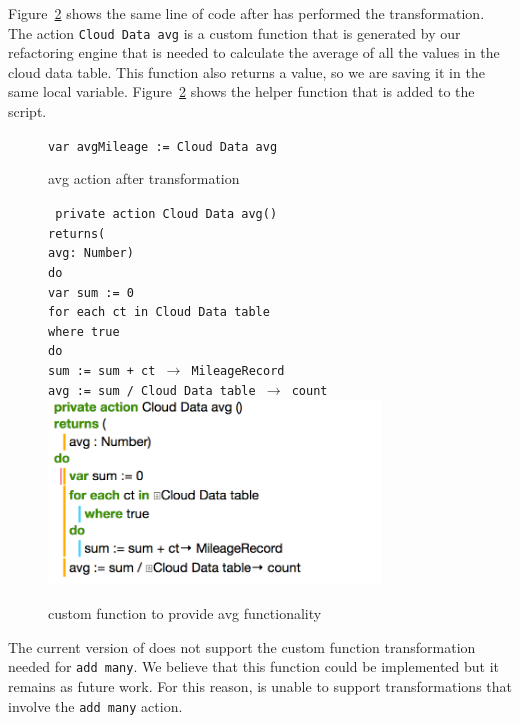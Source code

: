 \documentclass{sigplanconf}
\begin{document}
Figure~\ref{fig:CloudTable_avg_fun} shows the same line of code after \tool has performed the transformation.  The action \texttt{Cloud Data avg} is a custom function that is generated by our refactoring engine that is needed to calculate the average of all the values in the cloud data table.  This function also returns a value, so we are saving it in the same local variable.  Figure~\ref{fig:CloudTable_avg_fun} shows the helper function that is added to the script.

\begin{figure}[htbp!]
\begin{center}
\texttt{var avgMileage := Cloud Data avg}
\nocaptionrule
\caption{avg action after transformation}
\label{fig:CloudTable_avg}
\end{center}

\end{figure}
\begin{figure}[htbp!]
\texttt{ private action Cloud Data avg()\\ 
returns(\\
avg: Number)\\
do\\
var sum := 0\\
for each ct in Cloud Data table\\
where true\\
do\\
sum := sum + ct $\rightarrow$ MileageRecord\\
avg := sum / Cloud Data table $\rightarrow$ count}
\includegraphics[width=250pt]{images/HelperFunction}
\nocaptionrule
\caption{custom function to provide avg functionality}
\label{fig:CloudTable_avg_fun}
\end{figure}

The current version of \tool does not support the custom function transformation needed for \texttt{add many}.  We believe that this function could be implemented but it remains as future work.  For this reason,  \tool is unable to support transformations that involve the \texttt{add many} action.
\end{document}

